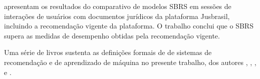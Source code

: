  \citet{jusbrasil2022} apresentam os resultados do comparativo de modelos SBRS em
sessões de interações de usuários com documentos jurídicos da plataforma
Jusbrasil, incluindo a recomendação vigente da plataforma. O trabalho
conclui que o SBRS supera as medidas de desempenho obtidas pela recomendação
vigente.

Uma série de livros sustenta as definições formais de de sistemas de
recomendação e de aprendizado de máquina no presente trabalho, dos autores
\citet{pml1Book}, \citet{jannach2011recommender}, \citet{ricci2010introduction},
\citet{mitchell1997} e \citet{aggarwal2016recommender}.